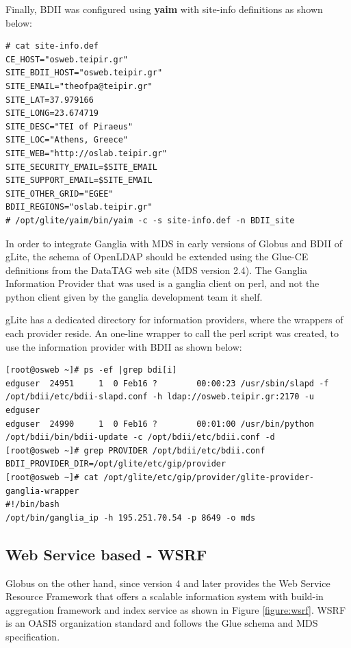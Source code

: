 Finally, BDII was configured using {\bf yaim} with site-info definitions as shown below:

\begin{lstlisting}
# cat site-info.def
CE_HOST="osweb.teipir.gr"
SITE_BDII_HOST="osweb.teipir.gr"
SITE_EMAIL="theofpa@teipir.gr"
SITE_LAT=37.979166
SITE_LONG=23.674719
SITE_DESC="TEI of Piraeus"
SITE_LOC="Athens, Greece"
SITE_WEB="http://oslab.teipir.gr"
SITE_SECURITY_EMAIL=$SITE_EMAIL
SITE_SUPPORT_EMAIL=$SITE_EMAIL
SITE_OTHER_GRID="EGEE"
BDII_REGIONS="oslab.teipir.gr"
# /opt/glite/yaim/bin/yaim -c -s site-info.def -n BDII_site
\end{lstlisting}

In order to integrate Ganglia with MDS in early versions of Globus and BDII of gLite, the schema of OpenLDAP should be extended using the Glue-CE definitions from the DataTAG web site (MDS version 2.4). The Ganglia Information Provider that was used is a ganglia client on perl, and not the python client given by the ganglia development team it shelf.

gLite has a dedicated directory for information providers, where the wrappers of each provider reside. An one-line wrapper to call the perl script was created, to use the information provider with BDII as shown below:

\begin{lstlisting}
[root@osweb ~]# ps -ef |grep bdi[i]
edguser  24951     1  0 Feb16 ?        00:00:23 /usr/sbin/slapd -f /opt/bdii/etc/bdii-slapd.conf -h ldap://osweb.teipir.gr:2170 -u edguser
edguser  24990     1  0 Feb16 ?        00:01:00 /usr/bin/python /opt/bdii/bin/bdii-update -c /opt/bdii/etc/bdii.conf -d
[root@osweb ~]# grep PROVIDER /opt/bdii/etc/bdii.conf
BDII_PROVIDER_DIR=/opt/glite/etc/gip/provider
[root@osweb ~]# cat /opt/glite/etc/gip/provider/glite-provider-ganglia-wrapper
#!/bin/bash
/opt/bin/ganglia_ip -h 195.251.70.54 -p 8649 -o mds
\end{lstlisting}

\subsection{Web Service based - WSRF}

Globus on the other hand, since version 4 and later provides the Web Service Resource Framework that offers a scalable information system with build-in aggregation framework and index service as shown in Figure \ref{figure:wsrf}. WSRF is an OASIS organization standard and follows the Glue schema and MDS specification.

